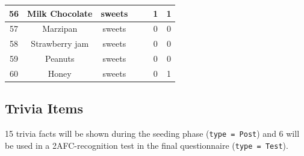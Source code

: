 \documentclass[
  letterpaper,
  DIV=11,
  numbers=noendperiod]{scrartcl}
\begin{document}
\begin{tabular}[t]{c|c|c|>{}c|>{}c|c|c}
\hline
56 & Milk Chocolate & sweets & \cellcolor[HTML]{414487}{\textcolor{white}{5620}} & \cellcolor[HTML]{4EC36B}{\textcolor{white}{539}} & 1 & 1\\
\hline
57 & Marzipan & sweets & \cellcolor[HTML]{3E4A89}{\textcolor{white}{6250}} & \cellcolor[HTML]{3BBB75}{\textcolor{white}{512}} & 0 & 0\\
\hline
58 & Strawberry jam & sweets & \cellcolor[HTML]{481668}{\textcolor{white}{1800}} & \cellcolor[HTML]{355E8D}{\textcolor{white}{229}} & 0 & 0\\
\hline
59 & Peanuts & sweets & \cellcolor[HTML]{481B6D}{\textcolor{white}{2150}} & \cellcolor[HTML]{63CB5F}{\textcolor{white}{567}} & 0 & 0\\
\hline
60 & Honey & sweets & \cellcolor[HTML]{470D60}{\textcolor{white}{1180}} & \cellcolor[HTML]{2A788E}{\textcolor{white}{306}} & 0 & 1\\
\hline
\end{tabular}

\subsection{Trivia Items}\label{trivia-items}

15 trivia facts will be shown during the seeding phase
(\texttt{type\ =\ Post}) and 6 will be used in a 2AFC-recognition test
in the final questionnaire (\texttt{type\ =\ Test}).
\end{document}
